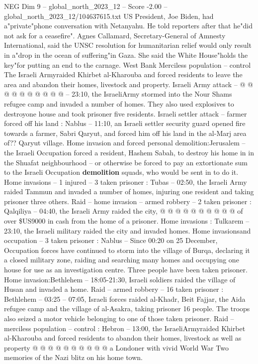 \begin{textsample}{NEG Dim 9 – global\_north\_2023\_12 – Score -2.00 – global\_north\_2023\_12/104637615.txt}
US President, Joe Biden, had a"private"phone conversation with Netanyahu.
He told reporters after that he"did not ask for a ceasefire".
Agnes Callamard, Secretary-General of Amnesty International, said the UNSC resolution for humanitarian relief would only result in a"drop in the ocean of suffering"in Gaza.
She said the White House"holds the key"for putting an end to the carnage.
West Bank Merciless population -- control The Israeli Armyraided Khirbet al-Kharouba and forced residents to leave the area and abandon their homes, livestock and property.
Israeli Army attack -- @ @ @ @ @ @ @ @ @ @ -- 23:10, the IsraeliArmy stormed into the Nour Shams refugee camp and invaded a number of homes.
They also used explosives to destroyone house and took prisoner five residents.
Israeli settler attack -- farmer forced off his land : Nablus -- 11:10, an Israeli settler security guard opened fire towards a farmer, Sabri Qaryut, and forced him off his land in the al-Marj area of??
Qaryut village.
Home invasion and forced personal demolition:Jerusalem -- the Israeli Occupation forced a resident, Hashem Sabah, to destroy his home in in the Shuafat neighbourhood -- or otherwise be forced to pay an extortionate sum to the Israeli Occupation \textbf{demolition} squads, who would be sent in to do it.
Home invasions -- 1 injured -- 3 taken prisoner : Tubas -- 02:50, the Israeli Army raided Tammun and invaded a number of homes, injuring one resident and taking prisoner three others.
Raid -- home invasion -- armed robbery -- 2 taken prisoner : Qalqiliya -- 04:40, the Israeli Army raided the city, @ @ @ @ @ @ @ @ @ @ of over \$US9000 in cash from the home of a prisoner.
Home invasions : Tulkarem -- 23:10, the Israeli military raided the city and invaded homes.
Home invasionsand occupation -- 3 taken prisoner : Nablus -- Since 00:20 on 25 December, Occupation forces have continued to storm into the village of Burqa, declaring it a closed military zone, raiding and searching many homes and occupying one house for use as an investigation centre.
Three people have been taken prisoner.
Home invasion:Bethlehem -- 18:05-21:30, Israeli soldiers raided the village of Husan and invaded a home.
Raid -- armed robbery -- 16 taken prisoner : Bethlehem -- 03:25 -- 07:05, Israeli forces raided al-Khadr, Beit Fajjar, the Aida refugee camp and the village of al-Asakra, taking prisoner 16 people.
The troops also seized a motor vehicle belonging to one of those taken prisoner.
Raid -- merciless population -- control : Hebron -- 13:00, the IsraeliArmyraided Khirbet al-Kharouba and forced residents to abandon their homes, livestock as well as property @ @ @ @ @ @ @ @ @ @ a Londoner with vivid World War Two memories of the Nazi blitz on his home town.

\end{textsample}
